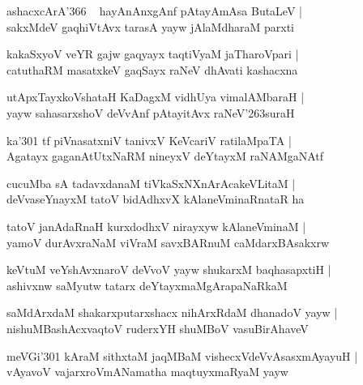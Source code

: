 \documentclass[twoside,12pt,openright]{book}
\def\S{\char'263}
\newcounter{shloka}[chapter]
\begin{document}
\begin{shloka}%
ashacxcArA\char'366 ~ hayAnAnxgAnf pAtayAmAsa ButaLeV |\\
sakxMdeV gaqhiVtAvx tarasA yayw jAlaMdharaM parxti
\end{shloka}

\begin{shloka}%
kakaSxyoV veYR gajw gaqyayx taqtiVyaM jaTharoVpari |\\
catuthaRM masatxkeV gaqSayx raNeV dhAvati kashacxna
\end{shloka}

\begin{shloka}%
utApxTayxkoVshataH KaDagxM vidhUya vimalAMbaraH |\\
yayw sahasarxshoV deVvAnf pAtayitAvx raNeV\S suraH 
\end{shloka}

\begin{shloka}%
ka\char'301 tf piVnasatxniV tanivxV KeVcariV ratilaMpaTA |\\
Agatayx gaganAtUtxNaRM nineyxV deYtayxM raNAMgaNAtf 
\end{shloka}

\begin{shloka}%
cucuMba sA tadavxdanaM tiVkaSxNXnArAcakeVLitaM |\\
deVvaseYnayxM tatoV bidAdhxvX kAlaneVminaRnataR ha
\end{shloka}

\begin{shloka}%
tatoV janAdaRnaH kurxdodhxV nirayxyw kAlaneVminaM |\\
yamoV durAvxraNaM viVraM savxBARnuM caMdarxBAsakxrw
\end{shloka}

\begin{shloka}%
keVtuM veYshAvxnaroV deVvoV yayw shukarxM baqhasapxtiH |\\
ashivxnw saMyutw tatarx deYtayxmaMgArapaNaRkaM 
\end{shloka}

\begin{shloka}%
saMdArxdaM shakarxputarxshacx nihArxRdaM dhanadoV yayw |\\
nishuMBashAcxvaqtoV ruderxYH shuMBoV vasuBirAhaveV 
\end{shloka}

\begin{shloka}%
meVGi\char'301 kAraM sithxtaM jaqMBaM vishecxVdeVvAsasxmAyayuH |\\
vAyavoV vajarxroVmANamatha maqtuyxmaRyaM yayw 
\end{shloka}
\end{document}
